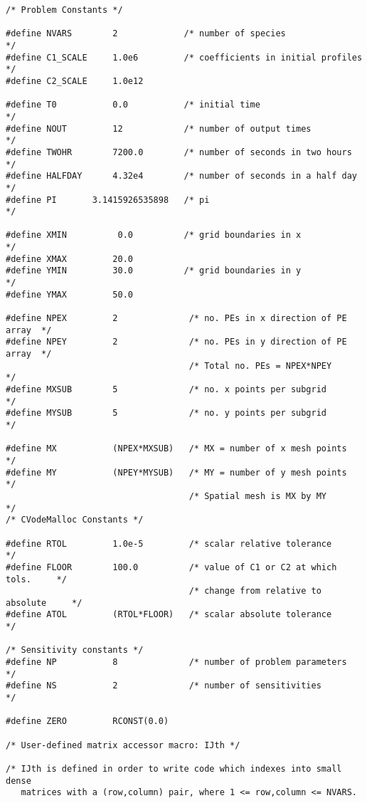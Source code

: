 \begin{verbatim}
/* Problem Constants */

#define NVARS        2             /* number of species                    */
#define C1_SCALE     1.0e6         /* coefficients in initial profiles     */
#define C2_SCALE     1.0e12

#define T0           0.0           /* initial time                         */
#define NOUT         12            /* number of output times               */
#define TWOHR        7200.0        /* number of seconds in two hours       */
#define HALFDAY      4.32e4        /* number of seconds in a half day      */
#define PI       3.1415926535898   /* pi                                   */ 

#define XMIN          0.0          /* grid boundaries in x                 */
#define XMAX         20.0           
#define YMIN         30.0          /* grid boundaries in y                 */
#define YMAX         50.0

#define NPEX         2              /* no. PEs in x direction of PE array  */
#define NPEY         2              /* no. PEs in y direction of PE array  */
                                    /* Total no. PEs = NPEX*NPEY           */
#define MXSUB        5              /* no. x points per subgrid            */
#define MYSUB        5              /* no. y points per subgrid            */

#define MX           (NPEX*MXSUB)   /* MX = number of x mesh points        */
#define MY           (NPEY*MYSUB)   /* MY = number of y mesh points        */
                                    /* Spatial mesh is MX by MY            */
/* CVodeMalloc Constants */

#define RTOL         1.0e-5         /* scalar relative tolerance            */
#define FLOOR        100.0          /* value of C1 or C2 at which tols.     */
                                    /* change from relative to absolute     */
#define ATOL         (RTOL*FLOOR)   /* scalar absolute tolerance            */

/* Sensitivity constants */
#define NP           8              /* number of problem parameters         */
#define NS           2              /* number of sensitivities              */

#define ZERO         RCONST(0.0)

/* User-defined matrix accessor macro: IJth */

/* IJth is defined in order to write code which indexes into small dense
   matrices with a (row,column) pair, where 1 <= row,column <= NVARS.   


\end{verbatim}
